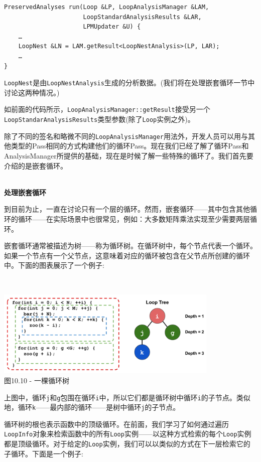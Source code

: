 \begin{lstlisting}[style=styleCXX]
PreservedAnalyses run(Loop &LP, LoopAnalysisManager &LAM,
					  LoopStandardAnalysisResults &LAR,
					  LPMUpdater &U) {
	…
	LoopNest &LN = LAM.getResult<LoopNestAnalysis>(LP, LAR);
	…
}
\end{lstlisting}

\texttt{LoopNest}是由\texttt{LoopNestAnalysis}生成的分析数据。(我们将在处理嵌套循环一节中讨论这两种情况。)

如前面的代码所示，\texttt{LoopAnalysisManager::getResult}接受另一个\texttt{LoopStandarAnalysisResults}类型参数(除了\texttt{Loop}实例之外)。

除了不同的签名和略微不同的\texttt{LoopAnalysisManager}用法外，开发人员可以用与其他类型的Pass相同的方式构建他们的循环Pass。现在我们已经了解了循环Pass和AnalysisManager所提供的基础，现在是时候了解一些特殊的循环了。我们首先要介绍的是嵌套循环。

\hspace*{\fill} \\ %
\noindent
\textbf{处理嵌套循环}

到目前为止，一直在讨论只有一个层的循环。然而，嵌套循环——其中包含其他循环的循环——在实际场景中也很常见，例如：大多数矩阵乘法实现至少需要两层循环。

嵌套循环通常被描述为树——称为循环树。在循环树中，每个节点代表一个循环。如果一个节点有一个父节点，这意味着对应的循环被包含在父节点所创建的循环中。下面的图表展示了一个例子:

\hspace*{\fill} \\ %
\begin{center}
\includegraphics[width=0.8\textwidth]{content/3/chapter10/images/10.png}\\
图10.10 - 一棵循环树
\end{center}

上图中，循环\texttt{j}和\texttt{g}包围在循环\texttt{i}中，所以它们都是循环树中循环\texttt{i}的子节点。类似地，循环\texttt{k}——最内部的循环——是树中循环\texttt{j}的子节点。

循环树的根也表示函数中的顶级循环。在前面，我们学习了如何通过遍历\texttt{LoopInfo}对象来检索函数中的所有\texttt{Loop}实例——以这种方式检索的每个\texttt{Loop}实例都是顶级循环。对于给定的\texttt{Loop}实例，我们可以以类似的方式在下一层检索它的子循环。下面是一个例子:

